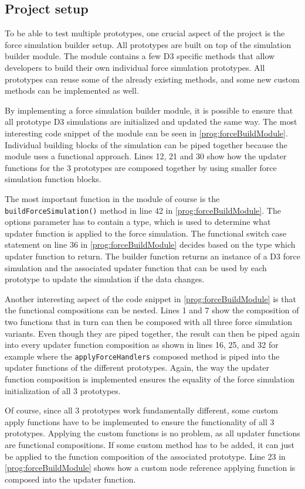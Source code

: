 \subsection{Project setup}

To be able to test multiple prototypes, one crucial aspect of the project is the force simulation builder setup. All prototypes are built on top of the simulation builder module. The module contains a few D3 specific methods that allow developers to build their own individual force simulation prototypes. All prototypes can reuse some of the already existing methods, and some new custom methods can be implemented as well.

By implementing a force simulation builder module, it is possible to ensure that all prototype D3 simulations are initialized and updated the same way. The most interesting code snippet of the module can be seen in \ref{prog:forceBuildModule}. Individual building blocks of the simulation can be piped together because the module uses a functional approach. Lines 12, 21 and 30 show how the updater functions for the 3 prototypes are composed together by using smaller force simulation function blocks.

The most important function in the module of course is the \texttt{buildForceSimulation()} method in line 42 in \ref{prog:forceBuildModule}. The options parameter has to contain a type, which is used to determine what updater function is applied to the force simulation. The functional switch case statement on line 36 in \ref{prog:forceBuildModule} decides based on the type which updater function to return. The builder function returns an instance of a D3 force simulation and the associated updater function that can be used by each prototype to update the simulation if the data changes.

Another interesting aspect of the code snippet in \ref{prog:forceBuildModule} is that the functional compositions can be nested. Lines 1 and 7 show the composition of two functions that in turn can then be composed with all three force simulation variants. Even though they are piped together, the result can then be piped again into every updater function composition as shown in lines 16, 25, and 32 for example where the \texttt{applyForceHandlers} composed method is piped into the updater functions of the different prototypes. Again, the way the updater function composition is implemented ensures the equality of the force simulation initialization of all 3 prototypes.

Of course, since all 3 prototypes work fundamentally different, some custom apply functions have to be implemented to ensure the functionality of all 3 prototypes. Applying the custom functions is no problem, as all updater functions are functional compositions. If some custom method has to be added, it can just be applied to the function composition of the associated prototype. Line 23 in \ref{prog:forceBuildModule} shows how a custom node reference applying function is composed into the updater function.

